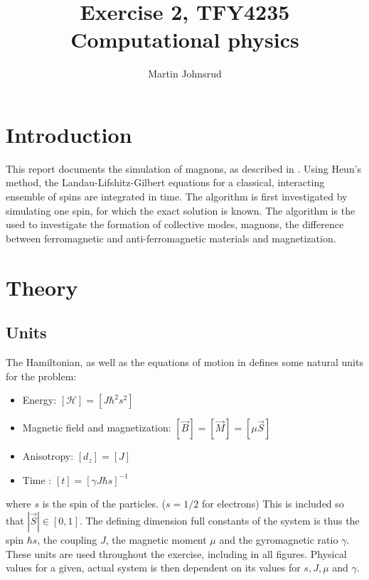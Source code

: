 \documentclass{article}
\title{Exercise 2, TFY4235 Computational physics}
\author{Martin Johnsrud}
\date{}
\begin{document}
    \maketitle
    \section*{Introduction}
    This report documents the simulation of magnons, as described in \cite{exercise}. Using Heun's method, the Landau-Lifshitz-Gilbert equations for a classical, interacting ensemble of spins are integrated in time. The algorithm is first investigated by simulating one spin, for which the exact solution is known. The algorithm is the used to investigate the formation of collective modes, magnons, the difference between ferromagnetic and anti-ferromagnetic materials and magnetization. 

    \section*{Theory}
    \subsection*{Units}

    The Hamiltonian, as well as the equations of motion in \cite{exercise} defines some natural units for the problem: 
    \begin{itemize}
        \item Energy: $[\mathcal H] = [J \hbar^2 s^2]$
        \item Magnetic field and magnetization: $[\vec B] = [\vec M] = [\mu \vec S ]$
        \item Anisotropy: $[d_z] = [J]$
        \item Time : $[t] = [\gamma J \hbar s]^{-1}$
    \end{itemize}
     where $s$ is the spin of the particles. ($s=1/2$ for electrons) This is included so that $|\vec S|\in[0, 1]$. The defining dimension full constants of the system is thus the spin $\hbar s$, the coupling $J$, the magnetic moment $\mu$ and the gyromagnetic ratio $\gamma$. These units are used throughout the exercise, including in all figures. Physical values for a given, actual system is then dependent on its values for $s, J, \mu$ and $\gamma$.
\end{document}
